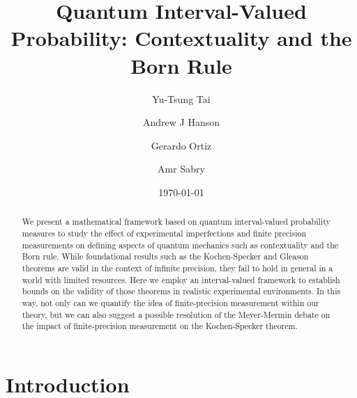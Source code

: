 \documentclass[english,reprint, aps, prl,superscriptaddress, showpacs,
showkeys, longbibliography, amsmath, amssymb, floatfix]{revtex4-1}
\theoremstyle{plain}
\theoremstyle{definition}
\begin{document}
\title{Quantum Interval-Valued Probability: Contextuality and the Born Rule}

\author{Yu-Tsung Tai}

\author{Andrew J Hanson}

\author{Gerardo Ortiz}

\author{Amr Sabry}

\date{\today}

\begin{abstract}
  We present a mathematical framework based on quantum interval-valued
  probability measures to study the effect of experimental
  imperfections and finite precision measurements on defining aspects
  of quantum mechanics such as contextuality and the Born rule. While
  foundational results such as the Kochen-Specker and Gleason theorems
  are valid in the context of infinite precision, they fail to hold in
  general in a world with limited resources. Here we employ an
  interval-valued framework to establish bounds on the validity of
  those theorems in realistic experimental environments. In this way,
  not only can we quantify the idea of finite-precision measurement
  within our theory, but we can also suggest a possible resolution of
  the Meyer-Mermin debate on the impact of finite-precision
  measurement on the Kochen-Specker theorem.
\end{abstract}



\maketitle

\section{Introduction}
\end{document}

